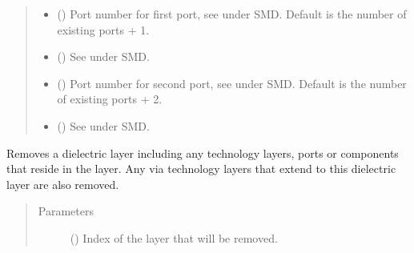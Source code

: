\documentclass[letterpaper,10pt,english,openany]{sphinxmanual}
\begin{document}
\begin{fulllineitems}
\begin{fulllineitems}
\begin{quote}
\begin{description}
\begin{itemize}
\item {} 
 () \textendash{} Port number for first port, see \label{\detokenize{source/sonpy:id5}}{\hyperref[\detokenize{source/users_guide:son15}]{\sphinxcrossref{{[}Son15{]}}}} under SMD. Default is the number of existing ports + 1.

\item {} 
 () \textendash{} See \label{\detokenize{source/sonpy:id6}}{\hyperref[\detokenize{source/users_guide:son15}]{\sphinxcrossref{{[}Son15{]}}}} under SMD.

\item {} 
 () \textendash{} Port number for second port, see \label{\detokenize{source/sonpy:id7}}{\hyperref[\detokenize{source/users_guide:son15}]{\sphinxcrossref{{[}Son15{]}}}} under SMD. Default is the number of existing ports + 2.

\item {} 
 () \textendash{} See \label{\detokenize{source/sonpy:id8}}{\hyperref[\detokenize{source/users_guide:son15}]{\sphinxcrossref{{[}Son15{]}}}} under SMD.

\end{itemize}

\end{description}\end{quote}

\end{fulllineitems}


\begin{fulllineitems}
\label{\detokenize{source/sonpy:sonpy.sonnet.removeDlayer}}
Removes a dielectric layer including any technology layers, ports or components that reside in the layer. Any via technology layers that extend to this dielectric layer are also removed.
\begin{quote}\begin{description}
\item[{Parameters}] \leavevmode
{} () \textendash{} Index of the layer that will be removed.


\end{description}
\end{quote}
\end{fulllineitems}
\end{fulllineitems}
\end{document}
